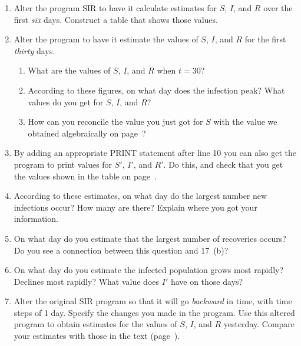 \begin{enumerate}
\item Alter the program SIR to have it calculate estimates for $S$,
$I$, and $R$ over the first {\em six\/} days.  Construct a table that
shows those values.



\item Alter the program to have it estimate the values of $S$, $I$, and
$R$ for the first {\em thirty\/} days.

  \begin{enumerate}
  \item What are the values of $S$, $I$, and $R$ when $t = 30$?

  \item According to these figures, on what day does the infection peak?
What values do you get for $S$, $I$, and $R$?

  \item How can you reconcile the value you just got for $S$ with the
value we obtained algebraically on page~\pageref{`threshold'}?



\end{enumerate}
\item By adding an appropriate PRINT statement after line 10 you can
also get the program to print values for $S'$, $I'$, and $R'$.  Do
this, and check that you get the values shown in the table on
page~\pageref{`threeday'}.


\item According to these estimates, on what day do the largest number
new infections occur?  How many are there?  Explain where you got your
information.


\item On what day do you estimate that the largest number of recoveries
occurs?  Do you see a connection between this question and 17~(b)?


\item On what day do you estimate the infected population grows most
rapidly?  Declines most rapidly?  What value does $I'$ have on those
days?


\item Alter the original SIR program so that it will go {\em
  backward\/} in time, with time steps of 1 day.  Specify the changes
you made in the program.  Use this altered program to obtain estimates
for the values of $S$, $I$, and $R$ yesterday.  Compare your estimates
with those in the text (page~\pageref{`threeday'}).


\end{enumerate}
